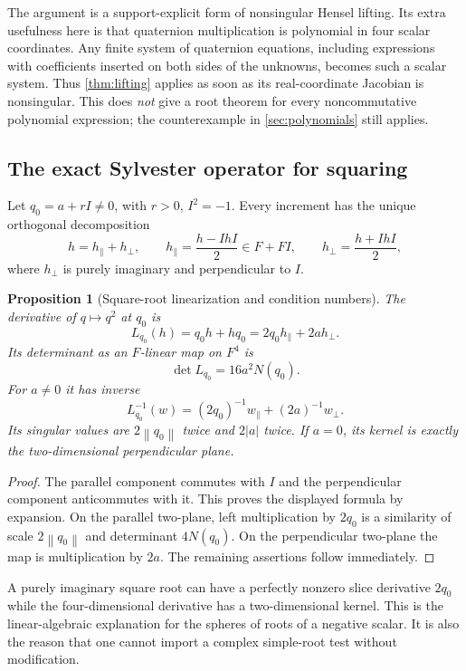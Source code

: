 \documentclass[11pt,letterpaper]{article}
\newtheorem{proposition}[theorem]{Proposition}
\theoremstyle{definition}
\newcommand{\norm}[1]{\left\lVert#1\right\rVert}
\begin{document}
The argument is a support-explicit form of nonsingular Hensel lifting. Its
extra usefulness here is that quaternion multiplication is polynomial in four
scalar coordinates. Any finite system of quaternion equations, including
expressions with coefficients inserted on both sides of the unknowns, becomes
such a scalar system. Thus \cref{thm:lifting} applies as soon as its
real-coordinate Jacobian is nonsingular. This does \emph{not} give a root theorem
for every noncommutative polynomial expression; the counterexample in
\cref{sec:polynomials} still applies.

\subsection{The exact Sylvester operator for squaring}
Let $q_0=a+rI\ne0$, with $r>0$, $I^2=-1$. Every increment has the unique
orthogonal decomposition
\[
 h=h_{\parallel}+h_{\perp},\qquad
 h_{\parallel}=\frac{h-IhI}{2}\in F+FI,\qquad
 h_{\perp}=\frac{h+IhI}{2},
\]
where $h_{\perp}$ is purely imaginary and perpendicular to $I$.

\begin{proposition}[Square-root linearization and condition numbers]
\label{prop:sylvester}
The derivative of $q\mapsto q^2$ at $q_0$ is
\begin{equation}
 L_{q_0}(h)=q_0h+hq_0
          =2q_0h_{\parallel}+2a h_{\perp}.
 \label{eq:sylvester}
\end{equation}
Its determinant as an $F$-linear map on $F^4$ is
\[
 \det L_{q_0}=16a^2N(q_0).
\]
For $a\ne0$ it has inverse
\begin{equation}
 L_{q_0}^{-1}(w)=(2q_0)^{-1}w_{\parallel}+(2a)^{-1}w_{\perp}.
 \label{eq:sylvester-inverse}
\end{equation}
Its singular values are $2\norm{q_0}$ twice and $2|a|$ twice. If $a=0$, its
kernel is exactly the two-dimensional perpendicular plane.
\end{proposition}
\begin{proof}
The parallel component commutes with $I$ and the perpendicular component
anticommutes with it. This proves the displayed formula by expansion. On the
parallel two-plane, left multiplication by $2q_0$ is a similarity of scale
$2\norm{q_0}$ and determinant $4N(q_0)$. On the perpendicular two-plane the
map is multiplication by $2a$. The remaining assertions follow immediately.
\end{proof}

A purely imaginary square root can have a perfectly nonzero slice derivative
$2q_0$ while the four-dimensional derivative has a two-dimensional kernel.
This is the linear-algebraic explanation for the spheres of roots of a
negative scalar. It is also the reason that one cannot import a complex
simple-root test without modification.
\end{document}
